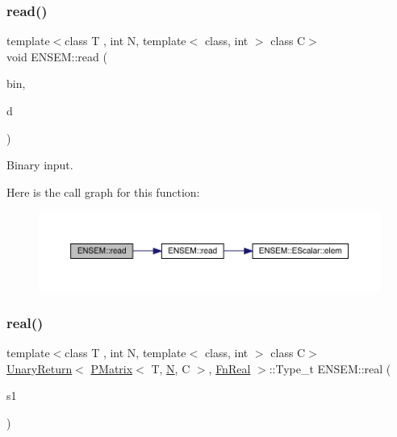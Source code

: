 \subsubsection{\texorpdfstring{read()}{read()}}
{\footnotesize\ttfamily template$<$class T , int N, template$<$ class, int $>$ class C$>$ \\
void E\+N\+S\+E\+M\+::read (\begin{DoxyParamCaption}\item[{\mbox{\hyperlink{classADATIO_1_1BinaryReader}{A\+D\+A\+T\+I\+O\+::\+Binary\+Reader}} \&}]{bin,  }\item[{\mbox{\hyperlink{classENSEM_1_1PMatrix}{P\+Matrix}}$<$ T, \mbox{\hyperlink{adat__devel_2lib_2hadron_2operator__name__util_8cc_a7722c8ecbb62d99aee7ce68b1752f337}{N}}, C $>$ \&}]{d }\end{DoxyParamCaption})\hspace{0.3cm}{\ttfamily [inline]}}



Binary input. 

Here is the call graph for this function\+:\nopagebreak
\begin{figure}[H]
\begin{center}
\leavevmode
\includegraphics[width=350pt]{df/d0a/group__primmatrix_ga95daf5fb6c2f089f11774d123f8795d5_cgraph}
\end{center}
\end{figure}
\mbox{\label{group__primmatrix_ga5d6f44c46b47f8dc972b40a518058e0e}} 
\subsubsection{\texorpdfstring{real()}{real()}}
{\footnotesize\ttfamily template$<$class T , int N, template$<$ class, int $>$ class C$>$ \\
\mbox{\hyperlink{structENSEM_1_1UnaryReturn}{Unary\+Return}}$<$ \mbox{\hyperlink{classENSEM_1_1PMatrix}{P\+Matrix}}$<$ T, \mbox{\hyperlink{adat__devel_2lib_2hadron_2operator__name__util_8cc_a7722c8ecbb62d99aee7ce68b1752f337}{N}}, C $>$, \mbox{\hyperlink{structENSEM_1_1FnReal}{Fn\+Real}} $>$\+::Type\+\_\+t E\+N\+S\+E\+M\+::real (\begin{DoxyParamCaption}\item[{const \mbox{\hyperlink{classENSEM_1_1PMatrix}{P\+Matrix}}$<$ T, \mbox{\hyperlink{adat__devel_2lib_2hadron_2operator__name__util_8cc_a7722c8ecbb62d99aee7ce68b1752f337}{N}}, C $>$ \&}]{s1 }\end{DoxyParamCaption})\hspace{0.3cm}{\ttfamily [inline]}}

